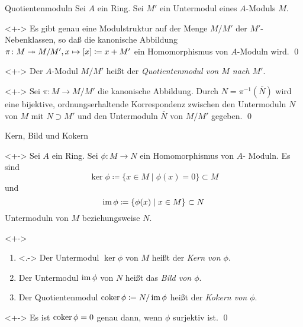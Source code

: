 \begin{frame}{Quotientenmoduln}
	Sei \(A\) ein Ring. Sei \(M'\) ein Untermodul eines \(A\)-Moduls \(M\).
	\begin{proposition}<+->
		Es gibt genau eine
		Modulstruktur auf der Menge \(M/M'\) der \(M'\)-Nebenklassen, so daß die
		kanonische Abbildung \(\pi\colon M \twoheadrightarrow M/M', x \mapsto [x] \coloneqq
		x + M'\) ein Homomorphismus von \(A\)-Moduln wird.
		\qed
	\end{proposition}
	\begin{definition}<+->
		Der \(A\)-Modul \(M/M'\) heißt der \emph{Quotientenmodul von \(M\) nach
		\(M'\)}.
	\end{definition}
	\begin{proposition}<+->
		Sei \(\pi\colon M \to M/M'\) die kanonische Abbildung.
		Durch \(N = \pi^{-1}(\bar N)\) wird eine bijektive, ordnungserhaltende
		Korrespondenz zwischen den Untermoduln \(N\) von \(M\) mit \(N \supset M'\)
		und den Untermoduln \(\bar N\) von \(M/M'\) gegeben.
		\qed
	\end{proposition}
\end{frame}

\begin{frame}{Kern, Bild und Kokern}
	\begin{visibleenv}<+->
		Sei \(A\) ein Ring. Sei \(\phi\colon M \to N\) ein Homomorphismus von \(A\)-
		Moduln. Es sind
		\[\ker \phi \coloneqq \{x \in M \mid \phi(x) = 0\} \subset
		M\] und \[\operatorname{im} \phi \coloneqq \{\phi(x) \mid x \in M\} \subset N\]
		Untermoduln von \(M\) beziehungsweise \(N\).
	\end{visibleenv}
	\begin{definition}<+->
		\begin{enumerate}[<+->]
		\item<.->
			Der Untermodul \(\ker \phi\) von \(M\) heißt der \emph{Kern von \(\phi\)}.
		\item
			Der Untermodul \(\operatorname{im} \phi\) von \(N\) heißt das
			\emph{Bild von \(\phi\)}.
		\item
			Der Quotientenmodul \(\operatorname{coker} \phi \coloneqq N/\operatorname{im} \phi\) heißt der
			\emph{Kokern von \(\phi\)}.
		\end{enumerate}
	\end{definition}
	\begin{proposition}<+->
		Es ist \(\operatorname{coker} \phi = 0\) genau dann, wenn \(\phi\) surjektiv ist.
		\qed
	\end{proposition}
\end{frame}


